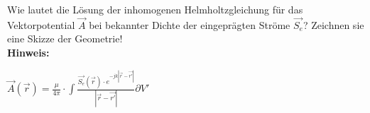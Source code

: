 \begin{question}[section=11,name={Helmholtz},difficulty=,quantity=,type=thr,tags={}]
	Wie lautet die Lösung der inhomogenen Helmholtzgleichung für das Vektorpotential $\vec{A}$ bei bekannter Dichte der eingeprägten Ströme $\vec{S_e}$? Zeichnen sie eine Skizze der Geometrie!
	\\ \textbf{Hinweis:}\\
	
\end{question}
\begin{solution}
	$\vec{A}(\vec{r}) = \frac{\mu}{4 \pi} \cdot \int{\frac{\vec{S_e}(\vec{r})\cdot e^{-jk|\vec{r}- \vec{r'}|}}{|\vec{r}- \vec{r'}|} \partial V'}$ \\
	
\end{solution}